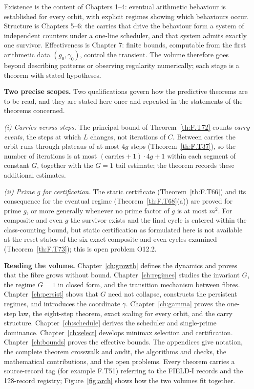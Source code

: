 Existence is the content of Chapters 1--4: eventual arithmetic behaviour is established for every orbit, with explicit regimes showing which behaviours occur. Structure is Chapters 5--6: the carries that drive the behaviour form a system of independent counters under a one-line scheduler, and that system admits exactly one survivor. Effectiveness is Chapter 7: finite bounds, computable from the first arithmetic data \((g_0,\gamma_0)\), control the transient. The volume therefore goes beyond describing patterns or observing regularity numerically; each stage is a theorem with stated hypotheses.

\textbf{Two precise scopes.} Two qualifications govern how the predictive theorems are to be read, and they are stated here once and repeated in the statements of the theorems concerned.

\emph{(i) Carries versus steps.} The principal bound of Theorem~\ref{th:F.T72} counts \emph{carry events}, the steps at which \(L\) changes, not iterations of \(C\). Between carries the orbit runs through plateaus of at most \(4g\) steps (Theorem~\ref{th:F.T37}), so the number of iterations is at most \((\text{carries}+1)\cdot4g+1\) within each segment of constant \(G\), together with the \(G=1\) tail estimate; the theorem records these additional estimates.

\emph{(ii) Prime \(g\) for certification.} The static certificate (Theorem~\ref{th:F.T66}) and its consequence for the eventual regime (Theorem~\ref{th:F.T68}(a)) are proved for prime \(g\), or more generally whenever no prime factor of \(g\) is at most \(m^2\). For composite and even \(g\) the survivor exists and the final cycle is entered within the class-counting bound, but static certification as formulated here is not available at the reset states of the six exact composite and even cycles examined (Theorem~\ref{th:F.T73}); this is open problem O12.2.

\textbf{Reading the volume.} Chapter~\ref{ch:growth} defines the dynamics and proves that the fibre grows without bound. Chapter~\ref{ch:regimes} studies the invariant \(G\), the regime \(G=1\) in closed form, and the transition mechanism between fibres. Chapter~\ref{ch:persist} shows that \(G\) need not collapse, constructs the persistent regimes, and introduces the coordinate \(\gamma\). Chapter~\ref{ch:gamma} proves the one-step law, the eight-step theorem, exact scaling for every orbit, and the carry structure. Chapter~\ref{ch:schedule} derives the scheduler and single-prime dominance. Chapter~\ref{ch:select} develops minimax selection and certification. Chapter~\ref{ch:bounds} proves the effective bounds. The appendices give notation, the complete theorem crosswalk and audit, the algorithms and checks, the mathematical contributions, and the open problems. Every theorem carries a source-record tag (for example F.T51) referring to the FIELD-I records and the 128-record registry; Figure~\ref{fig:arch} shows how the two volumes fit together.

